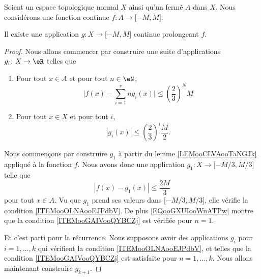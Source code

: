 \begin{lemma}     \label{LEMooSKSNooEdgFcR}
    Soient un espace topologique normal \( X\) ainsi qu'un fermé \( A\) dans \( X\). Nous considérons une fonction continue \( f\colon A\to \mathopen[ -M , M \mathclose]\).

    Il existe une application \( g\colon X\to \mathopen[ -M , M \mathclose]\) continue prolongeant \( f\).
\end{lemma}

\begin{proof}
    Nous allons commencer par construire une suite d'applications \( g_i\colon X\to \eR\) telles que
    \begin{enumerate}
        \item       \label{ITEMooGAIVooQYBCZj}
            Pour tout \( x\in A\) et pour tout \(n\in \eN\),
            \begin{equation}
                \big| f(x)-\sum_{i=1}^rng_i(x) \big|\leq \left( \frac{ 2 }{ 3 } \right)^NM
            \end{equation}
        \item       \label{ITEMooOLNAooEJPdbV}
            Pour tout \( x\in X\) et pour tout \( i\),
            \begin{equation}
                | g_i(x) |\leq \left( \frac{ 2 }{ 3 } \right)^i\frac{ M }{2}.
            \end{equation}
    \end{enumerate}
    Nous commençons par construire \( g_1\) à partir du lemme \ref{LEMooCLVAooTaNGJk} appliqué à la fonction \( f\). Nous avons donc une application \( g_1\colon X\to \mathopen[ -M/3 , M/3 \mathclose]\) telle que
    \begin{equation}        \label{EQooGXUIooWnATPw}
        | f(x)-g_1(x) |\leq \frac{ 2M }{ 3 }
    \end{equation}
    pour tout \( x\in A\). Vu que \( g_1\) prend ses valeurs dans \( \mathopen[ -M/3 , M/3 \mathclose]\), elle vérifie la condition \ref{ITEMooOLNAooEJPdbV}. De plus \eqref{EQooGXUIooWnATPw} montre que la condition \ref{ITEMooGAIVooQYBCZj} est vérifiée pour \( n=1\).

    Et c'est parti pour la récurrence. Nous supposons avoir des applications \( g_i\) pour \( i=1,\ldots, k\) qui vérifient la condition \ref{ITEMooOLNAooEJPdbV}, et telles que la condition \ref{ITEMooGAIVooQYBCZj} est satisfaite pour \(  n=1,\ldots, k\). Nous allons maintenant construire \( g_{k+1}\).


\end{proof}
